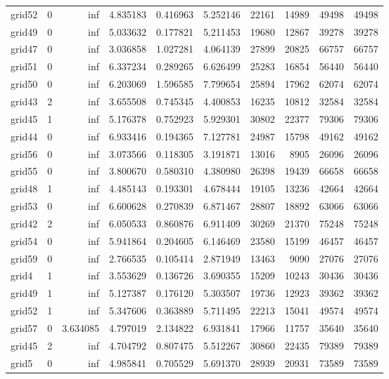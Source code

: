 \begin{longtable}{|l|r|r|r|r|r|r|r|r|r|}
grid52 & 0 & inf & 4.835183 & 0.416963 & 5.252146 & 22161 & 14989 & 49498 & 49498 \\
grid49 & 0 & inf & 5.033632 & 0.177821 & 5.211453 & 19680 & 12867 & 39278 & 39278 \\
grid47 & 0 & inf & 3.036858 & 1.027281 & 4.064139 & 27899 & 20825 & 66757 & 66757 \\
grid51 & 0 & inf & 6.337234 & 0.289265 & 6.626499 & 25283 & 16854 & 56440 & 56440 \\
grid50 & 0 & inf & 6.203069 & 1.596585 & 7.799654 & 25894 & 17962 & 62074 & 62074 \\
grid43 & 2 & inf & 3.655508 & 0.745345 & 4.400853 & 16235 & 10812 & 32584 & 32584 \\
grid45 & 1 & inf & 5.176378 & 0.752923 & 5.929301 & 30802 & 22377 & 79306 & 79306 \\
grid44 & 0 & inf & 6.933416 & 0.194365 & 7.127781 & 24987 & 15798 & 49162 & 49162 \\
grid56 & 0 & inf & 3.073566 & 0.118305 & 3.191871 & 13016 & 8905 & 26096 & 26096 \\
grid55 & 0 & inf & 3.800670 & 0.580310 & 4.380980 & 26398 & 19439 & 66658 & 66658 \\
grid48 & 1 & inf & 4.485143 & 0.193301 & 4.678444 & 19105 & 13236 & 42664 & 42664 \\
grid53 & 0 & inf & 6.600628 & 0.270839 & 6.871467 & 28807 & 18892 & 63066 & 63066 \\
grid42 & 2 & inf & 6.050533 & 0.860876 & 6.911409 & 30269 & 21370 & 75248 & 75248 \\
grid54 & 0 & inf & 5.941864 & 0.204605 & 6.146469 & 23580 & 15199 & 46457 & 46457 \\
grid59 & 0 & inf & 2.766535 & 0.105414 & 2.871949 & 13463 & 9090 & 27076 & 27076 \\
grid4 & 1 & inf & 3.553629 & 0.136726 & 3.690355 & 15209 & 10243 & 30436 & 30436 \\
grid49 & 1 & inf & 5.127387 & 0.176120 & 5.303507 & 19736 & 12923 & 39362 & 39362 \\
grid52 & 1 & inf & 5.347606 & 0.363889 & 5.711495 & 22213 & 15041 & 49574 & 49574 \\
grid57 & 0 & 3.634085 & 4.797019 & 2.134822 & 6.931841 & 17966 & 11757 & 35640 & 35640 \\
grid45 & 2 & inf & 4.704792 & 0.807475 & 5.512267 & 30860 & 22435 & 79389 & 79389 \\
grid5 & 0 & inf & 4.985841 & 0.705529 & 5.691370 & 28939 & 20931 & 73589 & 73589 \\

\end{longtable}
